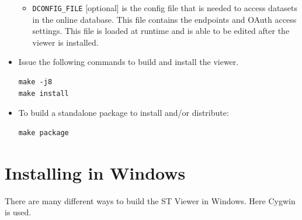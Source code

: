 \documentclass[10pt,a4paper,titlepage]{book}
\begin{document}
\begin{appendices}
\begin{itemize}[itemsep=10pt]
\begin{itemize}
\item[] \texttt{DCONFIG\_FILE} [optional] is the config file that is needed to access datasets in the online database. This file contains the endpoints and OAuth access settings. This file is loaded at runtime and is able to be edited after the viewer is installed.
\end{itemize}
\item Issue the following commands to build and install the viewer.
\begin{verbatim}
make -j8
make install
\end{verbatim}
\item To build a standalone package to install and/or distribute:
\begin{verbatim}
make package
\end{verbatim}
\end{itemize}

\pagebreak
\section*{Installing in Windows}
There are many different ways to build the ST Viewer in Windows. Here Cygwin is used.
\end{appendices}
\end{document}
